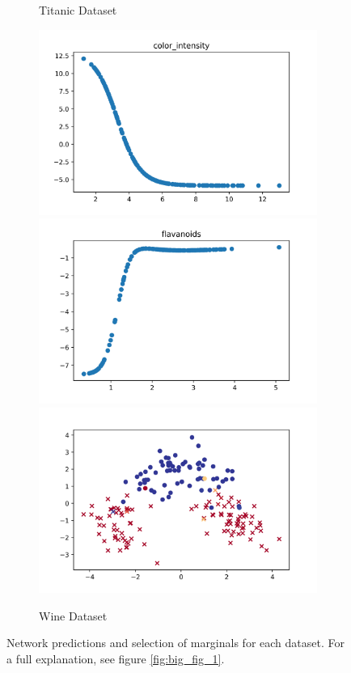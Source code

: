 \begin{figure}[!hp]
\begin{subfigure}{1.0\textwidth}
        \caption{Titanic Dataset}
    \end{subfigure}
    \begin{subfigure}{1.0\textwidth}
        \centering
        \includegraphics[width=.33\textwidth]{fig/mnl/wi1.png}%
        \includegraphics[width=.33\textwidth]{fig/mnl/wi2.png}%
        \includegraphics[width=.33\textwidth]{fig/plt/wi.png}
        \caption{Wine Dataset}
    \end{subfigure}
    \caption{Network predictions and selection of marginals for each dataset. For a full explanation, see figure \ref{fig:big_fig_1}.}
\end{figure}




    
    
    
    
